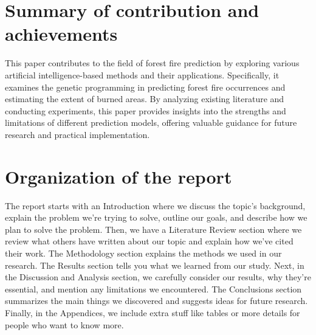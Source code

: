 \section{Summary of contribution and achievements}
This paper contributes to the field of forest fire prediction by exploring various artificial intelligence-based methods and their applications. Specifically, it examines the genetic programming in predicting forest fire occurrences and estimating the extent of burned areas. By analyzing existing literature and conducting experiments, this paper provides insights into the strengths and limitations of different prediction models, offering valuable guidance for future research and practical implementation.



\section{Organization of the report} 
The report starts with an Introduction where we discuss the topic's background, explain the problem we're trying to solve, outline our goals, and describe how we plan to solve the problem. Then, we have a Literature Review section where we review what others have written about our topic and explain how we've cited their work. The Methodology section explains the methods we used in our research. The Results section tells you what we learned from our study. Next, in the Discussion and Analysis section, we carefully consider our results, why they're essential, and mention any limitations we encountered. The Conclusions section summarizes the main things we discovered and suggests ideas for future research. Finally, in the Appendices, we include extra stuff like tables or more details for people who want to know more.





